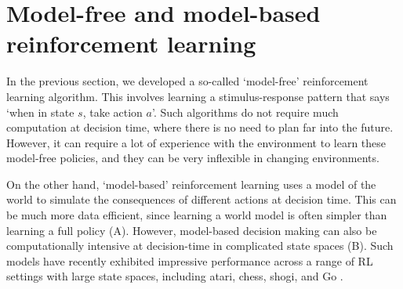 \section{Model-free and model-based reinforcement learning}

In the previous section, we developed a so-called `model-free' reinforcement learning algorithm.
This involves learning a stimulus-response pattern that says `when in state $s$, take action $a$'.
Such algorithms do not require much computation at decision time, where there is no need to plan far into the future.
However, it can require a lot of experience with the environment to learn these model-free policies, and they can be very inflexible in changing environments.

On the other hand, `model-based' reinforcement learning uses a model of the world to simulate the consequences of different actions at decision time.
This can be much more data efficient, since learning a world model is often simpler than learning a full policy (A).
However, model-based decision making can also be computationally intensive at decision-time in complicated state spaces (B).
Such models have recently exhibited impressive performance across a range of RL settings with large state spaces, including atari, chess, shogi, and Go \citep{silver2018general, schrittwieser2020mastering, deisenroth2011pilco}.

